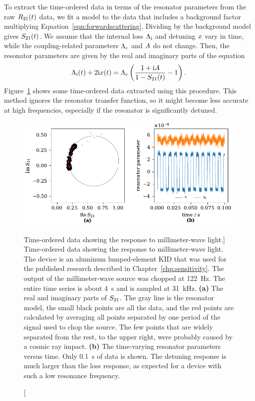 To extract the time-ordered data in terms of the resonator parameters from the raw $R_{21}(t)$ data, we fit a model to the data that includes a background factor multiplying Equation~\ref{eqn:forwardscattering}.
Dividing by the background model gives $S_{21}(t)$.
We assume that the internal loss $\Lambda_{\mathrm{i}}$ and detuning $x$ vary in time, while the coupling-related parameters $\Lambda_{\mathrm{c}}$ and $A$ do not change.
Then, the resonator parameters are given by the real and imaginary parts of the equation
\begin{equation}
\Lambda_{\mathrm{i}}(t) + 2 \mathrm{i} x(t)
  =
  \Lambda_{\mathrm{c}} \left( \frac{1 + \mathrm{i} A}{1 - S_{21}(t)} - 1 \right).
\end{equation}
Figure~\ref{fig:example_time-ordered_data} shows some time-ordered data extracted using this procedure.
This method ignores the resonator transfer function, so it might become less accurate at high frequencies, especially if the resonator is significantly detuned.

\begin{figure}[htb]
\centering
\includegraphics[width=\textwidth]{theory/example_time-ordered_data.pdf}
\caption
[Time-ordered data showing the response to millimeter-wave light.]
{Time-ordered data showing the response to millimeter-wave light.
The device is an aluminum lumped-element KID that was used for the published research described in Chapter~\ref{chp:sensitivity}.
The output of the millimeter-wave source was chopped at \SI{122}{Hz}.
The entire time series is about \SI{4}{s} and is sampled at \SI{31}{kHz}.
\textbf{(a)}
The real and imaginary parts of $S_{21}$.
The gray line is the resonator model, the small black points are all the data, and the red points are calculated by averaging all points separated by one period of the signal used to chop the source.
The few points that are widely separated from the rest, to the upper right, were probably caused by a cosmic ray impact.
\textbf{(b)}
The time-varying resonator parameters versus time.
Only \SI{0.1}{s} of data is shown.
The detuning response is much larger than the loss response, as expected for a device with such a low resonance frequency.
}
\label{fig:example_time-ordered_data}
\end{figure}
